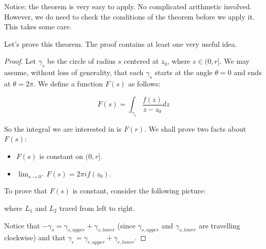 Notice: the theorem is very easy to apply. No complicated arithmetic involved. However, we do need to check the conditions of the theorem before we apply it. This takes some care.

Let's prove this theorem. The proof contains at least one very useful idea.

\begin{proof}Let $\gamma_s$ be the circle of radius $s$ centered at $z_0$, where $s\in(0,r]$. We may assume, without loss of generality, that each $\gamma_s$ starts at the angle $\theta = 0$ and ends at $\theta = 2\pi$. We define a function $F(s)$ as follows:

$$F(s) = \int_{\gamma_s}\frac{f(z)}{z-z_0}dz$$

So the integral we are interested in is $F(r)$. We shall prove two facts about $F(s)$:

\begin{itemize}
\item $F(s)$ is constant on $(0,r]$.
\item $\lim_{s\rightarrow 0^+} F(s) = 2\pi i f(z_0)$.
\end{itemize}

To prove that $F(s)$ is constant, consider the following picture:

\begin{center}
\end{center}

\noin where $L_1$ and $L_2$ travel from left to right.

Notice that $-\gamma_s = \gamma_{s,upper} + \gamma_{s,lower}$ (since $\gamma_{s,upper}$ and $\gamma_{s,lower}$ are travelling clockwise) and that $\gamma_r = \gamma_{r,upper} + \gamma_{r,lower}$.


\end{proof}
